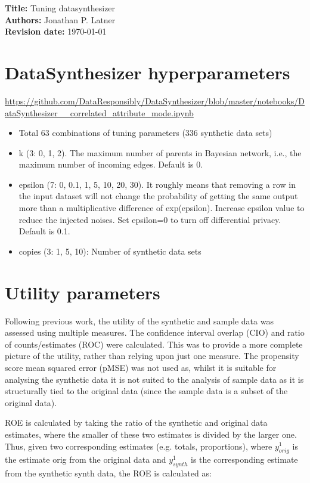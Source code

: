 \documentclass[12pt]{article}
\begin{document}
{\bf Title:} Tuning datasynthesizer \\
{\bf Authors:} Jonathan P. Latner \\
{\bf Revision date:} \today

\section{DataSynthesizer hyperparameters}

\url{https://github.com/DataResponsibly/DataSynthesizer/blob/master/notebooks/DataSynthesizer__correlated_attribute_mode.ipynb}


\begin{itemize}
    \item Total 63 combinations of tuning parameters (336 synthetic data sets)
    \item k (3: 0, 1, 2).  The maximum number of parents in Bayesian network, i.e., the maximum number of incoming edges.  Default is 0.
    \item epsilon (7: 0, 0.1, 1, 5, 10, 20, 30).  It roughly means that removing a row in the input dataset will not change the probability of getting the same output more than a multiplicative difference of exp(epsilon).  Increase epsilon value to reduce the injected noises. Set epsilon=0 to turn off differential privacy.  Default is 0.1.
    \item copies (3: 1, 5, 10): Number of synthetic data sets
\end{itemize}

\section{Utility parameters}

Following previous work, the utility of the synthetic and sample data was assessed using multiple measures. The confidence interval overlap (CIO) and ratio of counts/estimates (ROC) were calculated. This was to provide a more complete picture of the utility, rather than relying upon just one measure. The propensity score mean squared error (pMSE) was not used as, whilst it is suitable for analysing the synthetic data it is not suited to the analysis of sample data as it is structurally tied to the original data (since the sample data is a subset of the original data).

ROE is calculated by taking the ratio of the synthetic and original data estimates, where the smaller of these two estimates is divided by the larger one. Thus, given two corresponding estimates (e.g. totals, proportions), where $y^1_{orig}$ is the estimate orig from the original data and $y^1_{synth}$ is the corresponding estimate from the synthetic synth data, the ROE is calculated as:
\end{document}
